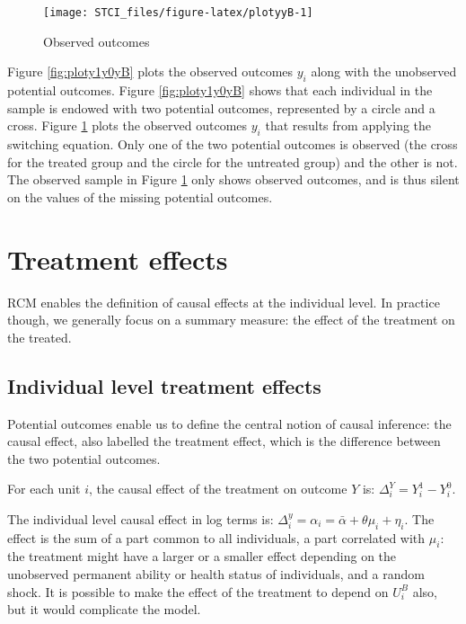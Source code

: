 \documentclass[]{book}
\theoremstyle{definition}
\theoremstyle{definition}
\theoremstyle{definition}
\theoremstyle{remark}
\let\BeginKnitrBlock\begin \let\EndKnitrBlock\end
\begin{document}
\begin{figure}

{\centering \texttt{[image: STCI\_files/figure-latex/plotyyB-1]} 

}

\caption{Observed outcomes}\label{fig:plotyyB}
\end{figure}

Figure \ref{fig:ploty1y0yB} plots the observed outcomes \(y_i\) along with the unobserved potential outcomes.
Figure \ref{fig:ploty1y0yB} shows that each individual in the sample is endowed with two potential outcomes, represented by a circle and a cross.
Figure \ref{fig:plotyyB} plots the observed outcomes \(y_i\) that results from applying the switching equation.
Only one of the two potential outcomes is observed (the cross for the treated group and the circle for the untreated group) and the other is not.
The observed sample in Figure \ref{fig:plotyyB} only shows observed outcomes, and is thus silent on the values of the missing potential outcomes.

\hypertarget{treatment-effects}{%
\section{Treatment effects}\label{treatment-effects}}

RCM enables the definition of causal effects at the individual level.
In practice though, we generally focus on a summary measure: the effect of the treatment on the treated.

\hypertarget{individual-level-treatment-effects}{%
\subsection{Individual level treatment effects}\label{individual-level-treatment-effects}}

Potential outcomes enable us to define the central notion of causal inference: the causal effect, also labelled the treatment effect, which is the difference between the two potential outcomes.

\BeginKnitrBlock{definition}[Individual level treatment effect]
\protect\hypertarget{def:causaleff}{}{\label{def:causaleff} \iffalse (Individual level treatment effect) \fi{} }For each unit \(i\), the causal effect of the treatment on outcome \(Y\) is: \(\Delta^Y_i=Y_i^1-Y_i^0\).
\EndKnitrBlock{definition}

\BeginKnitrBlock{example}
\protect\hypertarget{exm:unnamed-chunk-7}{}{\label{exm:unnamed-chunk-7} }The individual level causal effect in log terms is: \(\Delta^y_i=\alpha_i=\bar{\alpha}+\theta\mu_i+\eta_i\).
The effect is the sum of a part common to all individuals, a part correlated with \(\mu_i\): the treatment might have a larger or a smaller effect depending on the unobserved permanent ability or health status of individuals, and a random shock.
It is possible to make the effect of the treatment to depend on \(U_i^B\) also, but it would complicate the model.
\EndKnitrBlock{example}
\end{document}
